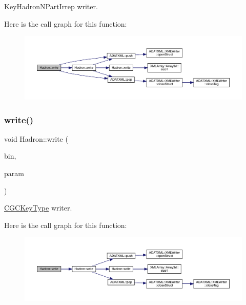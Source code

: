 Key\+Hadron\+N\+Part\+Irrep writer. 

Here is the call graph for this function\+:\nopagebreak
\begin{figure}[H]
\begin{center}
\leavevmode
\includegraphics[width=350pt]{d1/daf/namespaceHadron_a649265e2213fc38a7907196da52300cd_cgraph}
\end{center}
\end{figure}
\mbox{\label{namespaceHadron_af206eaa349ec42352cb0a106dfd89c5b}} 
\subsubsection{\texorpdfstring{write()}{write()}\hspace{0.1cm}{\footnotesize\ttfamily [12/95]}}
{\footnotesize\ttfamily void Hadron\+::write (\begin{DoxyParamCaption}\item[{\mbox{\hyperlink{classADATIO_1_1BinaryWriter}{Binary\+Writer}} \&}]{bin,  }\item[{const \mbox{\hyperlink{structHadron_1_1KeyCGCSU3__t}{Key\+C\+G\+C\+S\+U3\+\_\+t}} \&}]{param }\end{DoxyParamCaption})}



\mbox{\hyperlink{structHadron_1_1CGCKeyType}{C\+G\+C\+Key\+Type}} writer. 

Here is the call graph for this function\+:\nopagebreak
\begin{figure}[H]
\begin{center}
\leavevmode
\includegraphics[width=350pt]{d1/daf/namespaceHadron_af206eaa349ec42352cb0a106dfd89c5b_cgraph}
\end{center}
\end{figure}
\mbox{\label{namespaceHadron_a44eb64f50cbbc947364a538026c97ee6}} 
